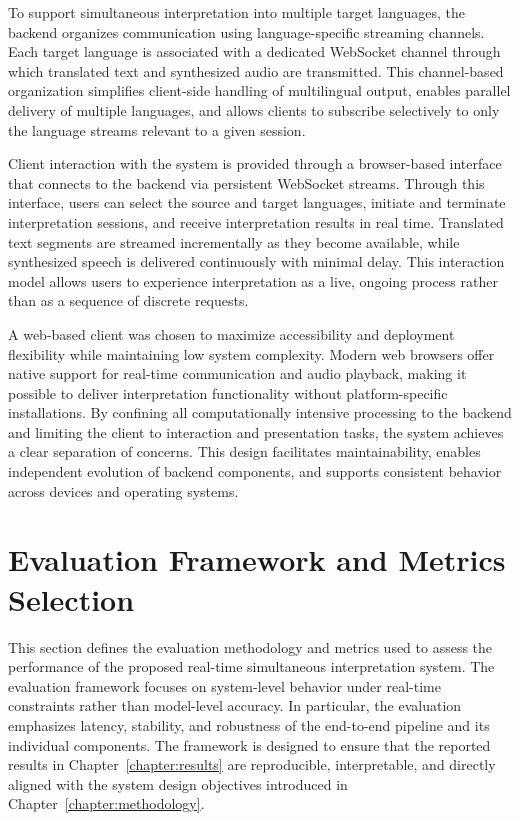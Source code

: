To support simultaneous interpretation into multiple target languages, the backend organizes communication using language-specific streaming channels. Each target language is associated with a dedicated WebSocket channel through which translated text and synthesized audio are transmitted. This channel-based organization simplifies client-side handling of multilingual output, enables parallel delivery of multiple languages, and allows clients to subscribe selectively to only the language streams relevant to a given session.

Client interaction with the system is provided through a browser-based interface that connects to the backend via persistent WebSocket streams. Through this interface, users can select the source and target languages, initiate and terminate interpretation sessions, and receive interpretation results in real time. Translated text segments are streamed incrementally as they become available, while synthesized speech is delivered continuously with minimal delay. This interaction model allows users to experience interpretation as a live, ongoing process rather than as a sequence of discrete requests.

A web-based client was chosen to maximize accessibility and deployment flexibility while maintaining low system complexity. Modern web browsers offer native support for real-time communication and audio playback, making it possible to deliver interpretation functionality without platform-specific installations. By confining all computationally intensive processing to the backend and limiting the client to interaction and presentation tasks, the system achieves a clear separation of concerns. This design facilitates maintainability, enables independent evolution of backend components, and supports consistent behavior across devices and operating systems.


\section{Evaluation Framework and Metrics Selection}
\label{sec:evaluation_framework}

This section defines the evaluation methodology and metrics used to assess the performance of the proposed real-time simultaneous interpretation system. The evaluation framework focuses on system-level behavior under real-time constraints rather than model-level accuracy. In particular, the evaluation emphasizes latency, stability, and robustness of the end-to-end pipeline and its individual components. The framework is designed to ensure that the reported results in Chapter~\ref{chapter:results} are reproducible, interpretable, and directly aligned with the system design objectives introduced in Chapter~\ref{chapter:methodology}.

